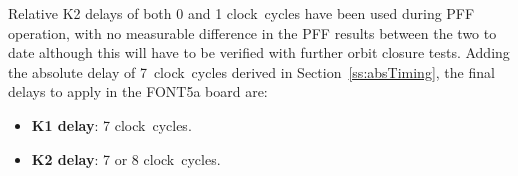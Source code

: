 Relative K2 delays of both 0 and 1 clock~cycles have been used during PFF operation, with no measurable difference in the PFF results between the two to date although this will have to be verified with further orbit closure tests. Adding the absolute delay of 7~clock~cycles derived in Section~\ref{ss:absTiming}, the final delays to apply in the FONT5a board are:
\begin{itemize}
\item \textbf{K1 delay}: 7 clock~cycles.
\item \textbf{K2 delay}: 7 or 8 clock~cycles.
\end{itemize}





